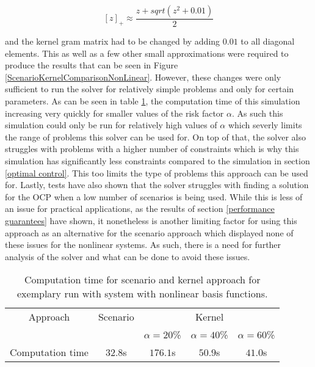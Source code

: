 \begin{equation} \label{max function}
[z]_+ \approx \frac{z + sqrt(z^2 + 0.01)}{2}
\end{equation}

and the kernel gram matrix had to be changed by adding $0.01$ to all diagonal elements. This as well as a few other small approximations were required to produce the results that can be seen in Figure \ref{ScenarioKernelComparisonNonLinear}. However, these changes were only sufficient to run the solver for relatively simple problems and only for certain parameters. As can be seen in table \ref{tab:computation times}, the computation time of this simulation increasing very quickly for smaller values of the risk factor $\alpha$. As such this simulation could only be run for relatively high values of $\alpha$ which severly limits the range of problems this solver can be used for. On top of that, the solver also struggles with problems with a higher number of constraints which is why this simulation has significantly less constraints compared to the simulation in section \ref{optimal control}. This too limits the type of problems this approach can be used for. Lastly, tests have also shown that the solver struggles with finding a solution for the OCP when a low number of scenarios is being used. While this is less of an issue for practical applications, as the results of section \ref{performance guarantees} have shown, it nonetheless is another limiting factor for using this approach as an alternative for the scenario approach which displayed none of these issues for the nonlinear systems. As such, there is a need for further analysis of the solver and what can be done to avoid these issues.



\begin{table}
\centering
\begin{tabular}{|c| c| c| c| c|}
\hline
Approach & Scenario &  \multicolumn{3}{|c|}{Kernel}\\  \cline{3-5} & &  $\alpha = 20$\% & $\alpha = 40$\% & $\alpha = 60$\% \\
\hline
Computation time & $32.8$s & $176.1$s & $50.9$s & $41.0$s\\
\hline
\end{tabular}
\caption{Computation time for scenario and kernel approach for exemplary run with system with nonlinear basis functions.}
\label{tab:computation times}
\end{table} 

